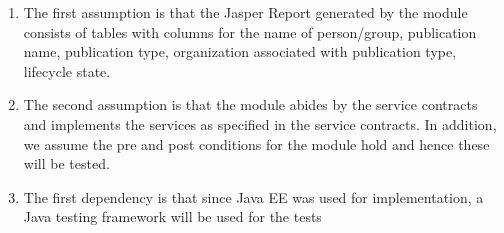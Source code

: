 \begin{enumerate}
	\item The first assumption is that the Jasper Report generated by the module consists of tables with columns for the name of person/group, publication name, publication type, organization associated with publication type, lifecycle state.
	\item The second assumption is that the module abides by the service contracts and implements the services as specified in the service contracts. In addition, we assume the pre and post conditions for the module hold and hence these will be tested.
	\item The first dependency is that since Java EE was used for implementation, a Java testing framework will be used for the tests
\end{enumerate}

\hypertarget{labelr}{}
